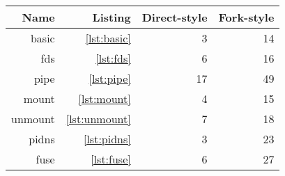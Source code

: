 \begin{tabular}{rrrr}
\hline
Name & Listing & Direct-style & Fork-style \\
\hline
basic & \ref{lst:basic} & 3 & 14 \\
fds & \ref{lst:fds} & 6 & 16 \\
pipe & \ref{lst:pipe} & 17 & 49 \\
mount & \ref{lst:mount} & 4 & 15 \\
unmount & \ref{lst:unmount} & 7 & 18 \\
pidns & \ref{lst:pidns} & 3 & 23 \\
fuse & \ref{lst:fuse} & 6 & 27 \\
\hline
\end{tabular}
